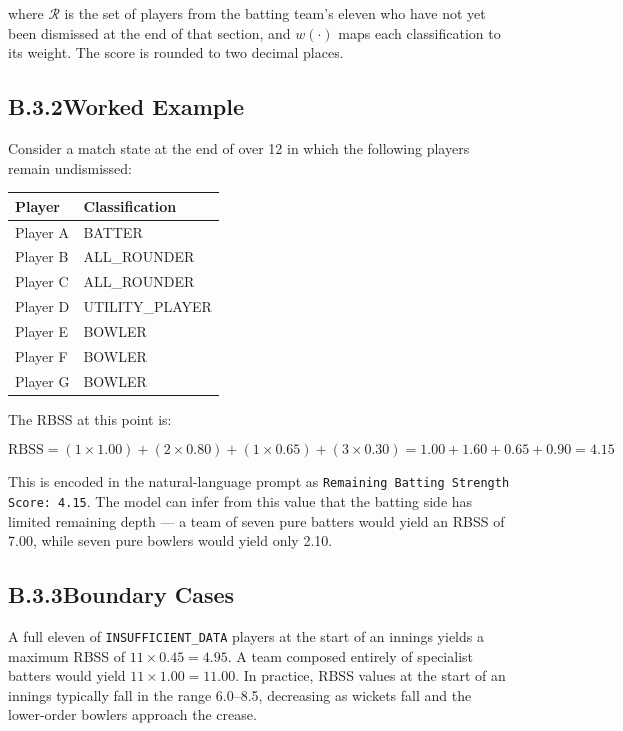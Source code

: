 where $\mathcal{R}$ is the set of players from the batting team's eleven who have not yet been dismissed at the end of that section, and $w(\cdot)$ maps each classification to its weight. The score is rounded to two decimal places.

\subsection*{B.3.2\quad Worked Example}

Consider a match state at the end of over 12 in which the following players remain undismissed:

\begin{center}
\begin{tabular}{ll}
\hline
\textbf{Player} & \textbf{Classification} \\
\hline
Player A & BATTER \\
Player B & ALL\_ROUNDER \\
Player C & ALL\_ROUNDER \\
Player D & UTILITY\_PLAYER \\
Player E & BOWLER \\
Player F & BOWLER \\
Player G & BOWLER \\
\hline
\end{tabular}
\end{center}

\vspace{0.5em}
The RBSS at this point is:

\begin{equation}
    \text{RBSS} = (1 \times 1.00) + (2 \times 0.80) + (1 \times 0.65) + (3 \times 0.30)
    = 1.00 + 1.60 + 0.65 + 0.90 = 4.15
\end{equation}

This is encoded in the natural-language prompt as \texttt{Remaining Batting Strength Score: 4.15}. The model can infer from this value that the batting side has limited remaining depth --- a team of seven pure batters would yield an RBSS of 7.00, while seven pure bowlers would yield only 2.10.

\subsection*{B.3.3\quad Boundary Cases}

A full eleven of \texttt{INSUFFICIENT\_DATA} players at the start of an innings yields a maximum RBSS of $11 \times 0.45 = 4.95$. A team composed entirely of specialist batters would yield $11 \times 1.00 = 11.00$. In practice, RBSS values at the start of an innings typically fall in the range 6.0--8.5, decreasing as wickets fall and the lower-order bowlers approach the crease.

